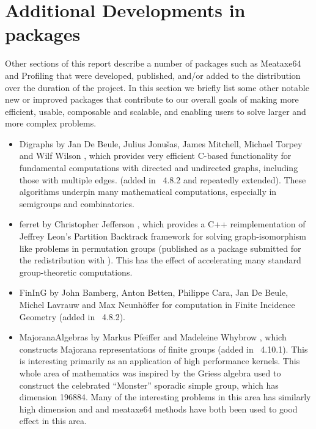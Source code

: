 \section{Additional Developments in \GAP packages} \label{sec:packages}

Other sections of this report describe
a number of \GAP packages such as Meataxe64 and Profiling that were developed, published,
and/or added to the \GAP distribution over the duration of the project.  In this section
we briefly list some other notable new or improved packages that
contribute to our overall goals of making \GAP more efficient, usable,
composable and scalable, and enabling users to solve larger and more
complex problems.

\begin{itemize}


\item
{\sf Digraphs} by Jan De Beule, Julius Jonu\v{s}as, James Mitchell,
Michael Torpey and Wilf Wilson \cite{Digraphs}, which provides very efficient C-based
functionality for fundamental computations with directed and
undirected graphs, including those with multiple edges. (added in
\GAP~4.8.2 and repeatedly extended).  These algorithms underpin many
mathematical computations, especially in semigroups and combinatorics.

\item
{\sf ferret} by Christopher Jefferson \cite{ferret}, which provides a C++
reimplementation of Jeffrey Leon's Partition Backtrack framework for
solving graph-isomorphism like problems in permutation groups
(published as a package submitted for the redistribution with
\GAP). This has the effect of accelerating many standard
group-theoretic computations.

\item
{\sf FinInG} by John Bamberg, Anton Betten, Philippe Cara, Jan De
Beule, Michel Lavrauw and Max Neunh\"offer \cite{fining} for computation in Finite
Incidence Geometry (added in \GAP~4.8.2).

\item
{\sf MajoranaAlgebras} by Markus Pfeiffer and Madeleine Whybrow \cite{MajoranaAlgebras}, which
constructs Majorana representations of finite groups (added in
\GAP~4.10.1). This is interesting primarily as an application of high
performance kernels. This whole area of mathematics was inspired by
the Griess algebra used to construct the celebrated ``Monster''
sporadic simple group, which has dimension 196884. Many of the
interesting problems in this area has similarly high dimension and
\HPCGAP and meataxe64 methods have both been used to good effect in
this area.
%
%


\end{itemize}
